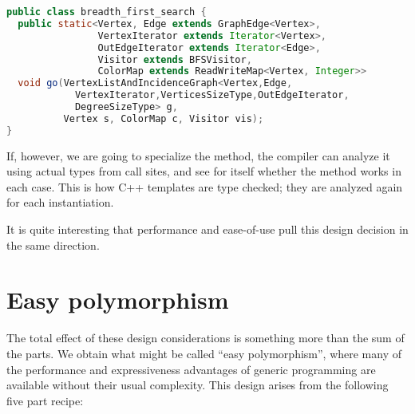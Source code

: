 \begin{singlespace}
\begin{lstlisting}[language=java,style=ttcode]
public class breadth_first_search {
  public static<Vertex, Edge extends GraphEdge<Vertex>,
                VertexIterator extends Iterator<Vertex>,
                OutEdgeIterator extends Iterator<Edge>,
                Visitor extends BFSVisitor,
                ColorMap extends ReadWriteMap<Vertex, Integer>>
  void go(VertexListAndIncidenceGraph<Vertex,Edge,
            VertexIterator,VerticesSizeType,OutEdgeIterator,
            DegreeSizeType> g,
          Vertex s, ColorMap c, Visitor vis);
}
\end{lstlisting}
\end{singlespace}


If, however, we are going to specialize the method, the compiler can analyze it
using actual types from call sites, and see for itself whether the method works
in each case.
This is how C++ templates are type checked; they are analyzed again for each
instantiation.

It is quite interesting that performance and ease-of-use pull this design
decision in the same direction.


\section{Easy polymorphism}



The total effect of these design considerations is something more than the
sum of the parts.
We obtain what might be called ``easy polymorphism'', where many of the performance
and expressiveness advantages of generic programming are available without
their usual complexity.
This design arises from the following five part recipe:

